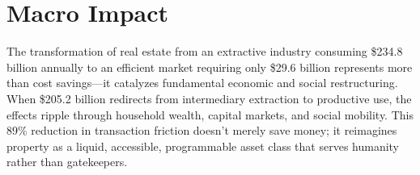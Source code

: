 \chapter{Macro Impact}

The transformation of real estate from an extractive industry consuming \$234.8 billion annually to an efficient market requiring only \$29.6 billion represents more than cost savings—it catalyzes fundamental economic and social restructuring. When \$205.2 billion redirects from intermediary extraction to productive use, the effects ripple through household wealth, capital markets, and social mobility. This 89\% reduction in transaction friction doesn't merely save money; it reimagines property as a liquid, accessible, programmable asset class that serves humanity rather than gatekeepers.

